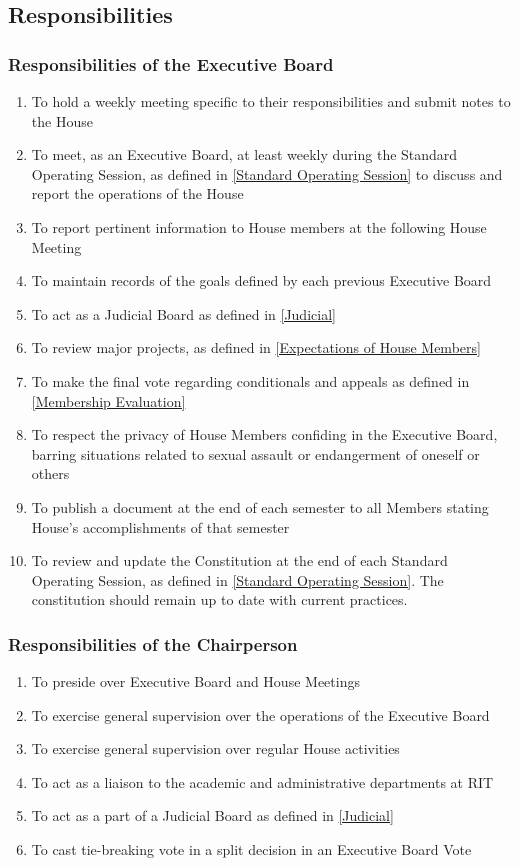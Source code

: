 \documentclass{article}
\newcommand{\asection}[1]{\subsection{#1} \label{#1}}
\newcommand{\asubsection}[1]{\subsubsection{#1} \label{#1}}
\begin{document}
\asection{Responsibilities}
\renewcommand{\theenumi}{\alph{enumi}} %
\asubsection{Responsibilities of the Executive Board}
\begin{enumerate}
	\item To hold a weekly meeting specific to their responsibilities and submit notes to the House
	\item To meet, as an Executive Board, at least weekly during the Standard Operating Session, as defined in \ref{Standard Operating Session} to discuss and report the operations of the House
	\item To report pertinent information to House members at the following House Meeting
	\item To maintain records of the goals defined by each previous Executive Board
	\item To act as a Judicial Board as defined in \ref{Judicial}
	\item To review major projects, as defined in \ref{Expectations of House Members}
	\item To make the final vote regarding conditionals and appeals as defined in \ref{Membership Evaluation}
	\item To respect the privacy of House Members confiding in the Executive Board, barring situations related to sexual assault or endangerment of oneself or others
	\item To publish a document at the end of each semester to all Members stating House’s accomplishments of that semester
	\item To review and update the Constitution at the end of each Standard Operating Session, as defined in \ref{Standard Operating Session}.
		The constitution should remain up to date with current practices.
\end{enumerate}

\asubsection{Responsibilities of the Chairperson}
\begin{enumerate}
	\item To preside over Executive Board and House Meetings
	\item To exercise general supervision over the operations of the Executive Board
	\item To exercise general supervision over regular House activities
	\item To act as a liaison to the academic and administrative departments at RIT
	\item To act as a part of a Judicial Board as defined in \ref{Judicial}
	\item To cast tie-breaking vote in a split decision in an Executive Board Vote
\end{enumerate}
\end{document}
